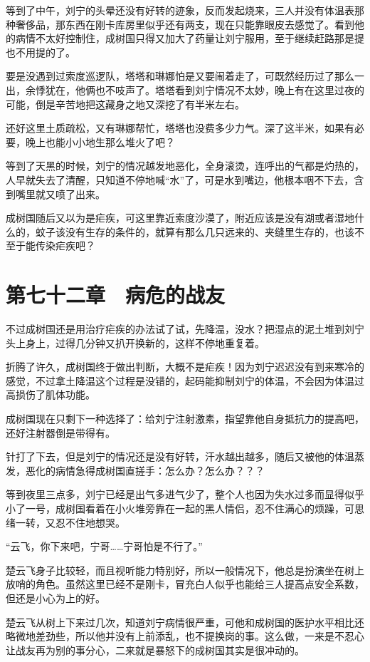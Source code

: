 等到了中午，刘宁的头晕还没有好转的迹象，反而发起烧来，三人并没有体温表那种奢侈品，那东西在刚卡库房里似乎还有两支，现在只能靠眼皮去感觉了。看到他的病情不太好控制住，成树国只得又加大了药量让刘宁服用，至于继续赶路那是提也不用提的了。

要是没遇到过索度巡逻队，塔塔和琳娜怕是又要闹着走了，可既然经历过了那么一出，余悸犹在，他俩也不吱声了。塔塔看到刘宁情况不太妙，晚上有在这里过夜的可能，倒是辛苦地把这藏身之地又深挖了有半米左右。

还好这里土质疏松，又有琳娜帮忙，塔塔也没费多少力气。深了这半米，如果有必要，晚上也能小小地生那么堆火了吧？

等到了天黑的时候，刘宁的情况越发地恶化，全身滚烫，连呼出的气都是灼热的，人早就失去了清醒，只知道不停地喊“水”了，可是水到嘴边，他根本咽不下去，含到嘴里就又喷了出来。

成树国随后又以为是疟疾，可这里靠近索度沙漠了，附近应该是没有湖或者湿地什么的，蚊子该没有生存的条件的，就算有那么几只远来的、夹缝里生存的，也该不至于能传染疟疾吧？

\section{第七十二章　病危的战友}

不过成树国还是用治疗疟疾的办法试了试，先降温，没水？把湿点的泥土堆到刘宁头上身上，过得几分钟又扒开换新的，这样不停地重复着。

折腾了许久，成树国终于做出判断，大概不是疟疾！因为刘宁迟迟没有到来寒冷的感觉，不过拿土降温这个过程是没错的，起码能抑制刘宁的体温，不会因为体温过高损伤了肌体功能。

成树国现在只剩下一种选择了：给刘宁注射激素，指望靠他自身抵抗力的提高吧，还好注射器倒是带得有。

针打了下去，但是刘宁的情况还是没有好转，汗水越出越多，随后又被他的体温蒸发，恶化的病情急得成树国直搓手：怎么办？怎么办？？？

等到夜里三点多，刘宁已经是出气多进气少了，整个人也因为失水过多而显得似乎小了一号，成树国看着在小火堆旁靠在一起的黑人情侣，忍不住满心的烦躁，可思绪一转，又忍不住地想哭。

“云飞，你下来吧，宁哥……宁哥怕是不行了。”

楚云飞身子比较轻，而且视听能力特别好，所以一般情况下，他总是扮演坐在树上放哨的角色。虽然这里已经不是刚卡，冒充白人似乎也能给三人提高点安全系数，但还是小心为上的好。

楚云飞从树上下来过几次，知道刘宁病情很严重，可他和成树国的医护水平相比还略微地差劲些，所以他并没有上前添乱，也不提换岗的事。这么做，一来是不忍心让战友再为别的事分心，二来就是暴怒下的成树国其实是很冲动的。

